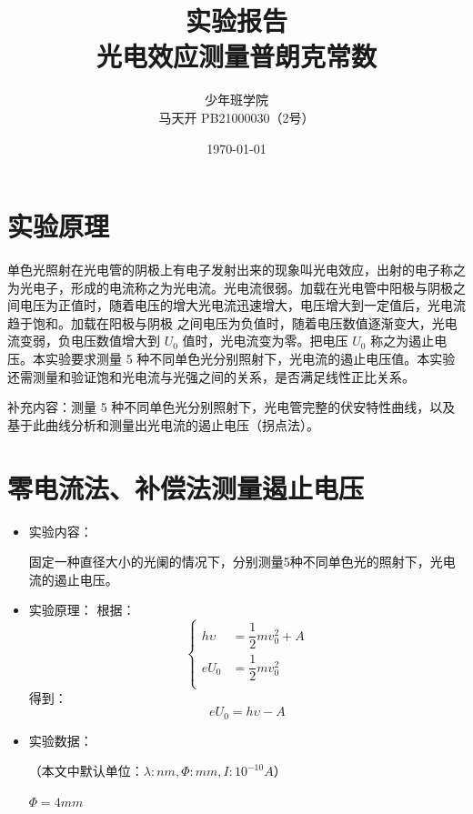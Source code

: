 \documentclass[a4paper]{ltxdoc}
\title {实验报告\\光电效应测量普朗克常数}
\author {少年班学院\\马天开 PB21000030（2号）}
\date {\today}
\newenvironment{Figure}
  {\par\medskip\noindent\minipage{\linewidth}}
  {\endminipage\par\medskip}
\begin{document}
\begin{multicols}{2}
    \maketitle
    \section{实验原理}
    单色光照射在光电管的阴极上有电子发射出来的现象叫光电效应，出射的电子称之为光电子，形成的电流称之为光电流。光电流很弱。加载在光电管中阳极与阴极之间电压为正值时，随着电压的增大光电流迅速增大，电压增大到一定值后，光电流趋于饱和。加载在阳极与阴极
    之间电压为负值时，随着电压数值逐渐变大，光电流变弱，负电压数值增大到 $U_0$ 值时，光电流变为零。把电压 $U_0$ 称之为遏止电压。本实验要求测量 5 种不同单色光分别照射下，光电流的遏止电压值。本实验还需测量和验证饱和光电流与光强之间的关系，是否满足线性正比关系。

    补充内容：测量 5 种不同单色光分别照射下，光电管完整的伏安特性曲线，以及基于此曲线分析和测量出光电流的遏止电压（拐点法）。

    \section{零电流法、补偿法测量遏止电压}
    \begin{itemize}
        \item 实验内容：

              固定一种直径大小的光阑的情况下，分别测量5种不同单色光的照射下，光电流的遏止电压。

        \item 实验原理：
              根据：
              $$
                  \left\{
                  \begin{aligned}
                      h \upsilon & = \dfrac 1 2 m v_{0}^2 + A \\
                      eU_0       & = \dfrac 1 2 m v_0^2       \\
                  \end{aligned}
                  \right.
              $$
              得到：
              \begin{equation}
                  eU_0 = h\upsilon - A
              \end{equation}
        \item 实验数据：


              （本文中默认单位：$\lambda: nm,\Phi: mm,I: 10^{-10} A$）
              \bigskip
              \begin{Figure}
                  \centering
                  $\Phi = 4 mm$


\end{Figure}
\end{itemize}
\end{multicols}
\end{document}
